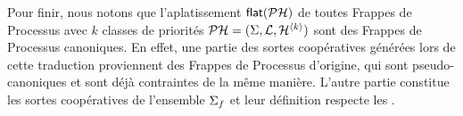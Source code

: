 
Pour finir, nous notons que l'aplatissement $\mathsf{flat}(\mathcal{PH})$ de toutes Frappes de Processus avec $k$
classes de priorités $\mathcal{PH} = (\Sigma, \mathcal{L}, \mathcal{H}^{{\langle k \rangle}})$
sont des Frappes de Processus canoniques.
En effet, une partie des sortes coopératives générées lors de cette traduction proviennent
des Frappes de Processus d'origine, qui sont pseudo-canoniques et sont déjà contraintes de la
même manière.
L'autre partie constitue les sortes coopératives de l'ensemble $\Sigma_f$ et leur définition
respecte les \allcr.
